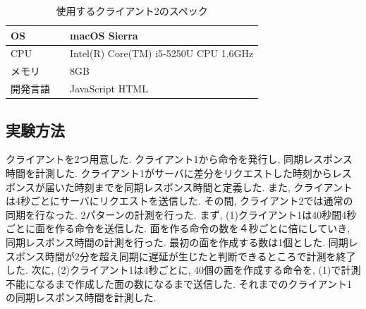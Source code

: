 \begin{table}[htbp]
\begin{center}
	\caption{使用するクライアント2のスペック}
	\begin{tabular}{|l|l|} \hline
		OS & macOS Sierra \\ \hline
		CPU & Intel(R) Core(TM) i5-5250U CPU 1.6GHz \\ \hline
		メモリ & 8GB \\ \hline
    開発言語　& JavaScript HTML \\ \hline
	\end{tabular}
	\label{client2}
\end{center}
\end{table}

\subsection{実験方法}
クライアントを2つ用意した.
クライアント1から命令を発行し, 同期レスポンス時間を計測した.
クライアント1がサーバに差分をリクエストした時刻からレスポンスが届いた時刻までを同期レスポンス時間と定義した.
また, クライアントは4秒ごとにサーバにリクエストを送信した. その間, クライアント2では通常の同期を行なった.
2パターンの計測を行った.
まず, (1)クライアント1は40秒間4秒ごとに面を作る命令を送信した. 面を作る命令の数を４秒ごとに倍にしていき, 同期レスポンス時間の計測を行った. 最初の面を作成する数は1個とした. 同期レスポンス時間が2分を超え同期に遅延が生じたと判断できるところで計測を終了した.
次に, (2)クライアント1は4秒ごとに, 40個の面を作成する命令を, (1)で計測不能になるまで作成した面の数になるまで送信した. それまでのクライアント1の同期レスポンス時間を計測した.

